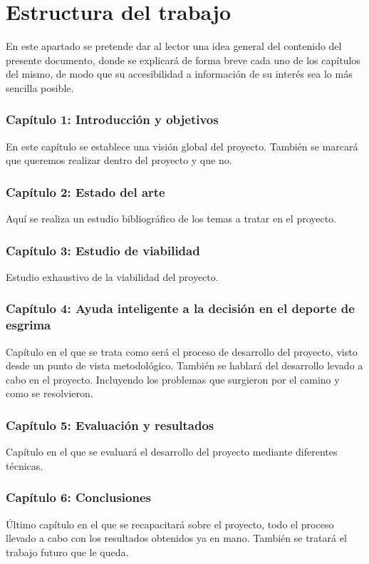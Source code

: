 \section{Estructura del trabajo}

En este apartado se pretende dar al lector una idea general del contenido del presente
documento, donde se explicará de forma breve cada uno de los capítulos del mismo, de modo
que su accesibilidad a información de su interés sea lo más sencilla posible.

\subsubsection{Capítulo 1: Introducción y objetivos}
En este capítulo se establece una visión global del proyecto. También se marcará
que queremos realizar dentro del proyecto y que no.

\subsubsection{Capítulo 2: Estado del arte}
Aquí se realiza un estudio bibliográfico de los temas a tratar en el proyecto.

\subsubsection{Capítulo 3: Estudio de viabilidad}
Estudio exhaustivo de la viabilidad del proyecto.

\subsubsection{Capítulo 4: Ayuda inteligente a la decisión en el deporte de esgrima}
Capítulo en el que se trata como será el proceso de desarrollo del proyecto, visto
desde un punto de vista metodológico. También se hablará del desarrollo levado a cabo en el proyecto. Incluyendo los problemas que surgieron por el camino y como se resolvieron.

\subsubsection{Capítulo 5: Evaluación y resultados}
Capítulo en el que se evaluará el desarrollo del proyecto mediante diferentes
técnicas.

\subsubsection{Capítulo 6: Conclusiones}
Último capítulo en el que se recapacitará sobre el proyecto, todo el proceso llevado
a cabo con los resultados obtenidos ya en mano. También se tratará el trabajo
futuro que le queda.
